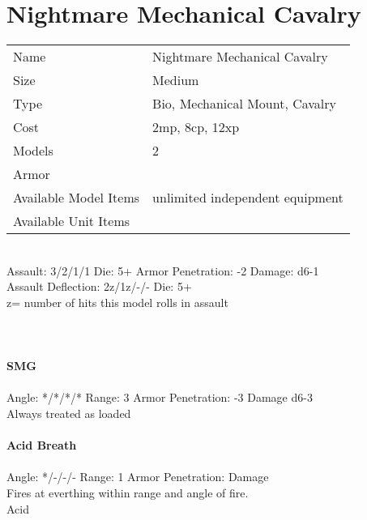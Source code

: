 \pagebreak

\section{ Nightmare Mechanical Cavalry }

\begin{tabular}{ll}
  Name & Nightmare Mechanical Cavalry \\
  Size & Medium\\
  Type & Bio, Mechanical Mount, Cavalry\\
  Cost & 2mp, 8cp, 12xp\\
  Models & 2\\
  Armor & \\
  Available Model Items & unlimited independent equipment \\
  Available Unit Items &  \\
\end{tabular}

\ \\
Assault: 3/2/1/1 Die: 5+ Armor Penetration: -2 Damage: d6-1 \\
Assault Deflection: 2z/1z/-/- Die: 5+\\
\indent z= number of hits this model rolls in assault \\
\ \\

\ \\
\ \\
{\bf SMG } \\
\ \\
Angle: */*/*/* Range: 3 Armor Penetration: -3 Damage d6-3 \\
\indent Always treated as loaded \\



\ \\
{\bf Acid Breath } \\
\ \\
Angle: */-/-/- Range: 1 Armor Penetration:  Damage  \\
\indent Fires at everthing within range and angle of fire. \\ Acid \\





